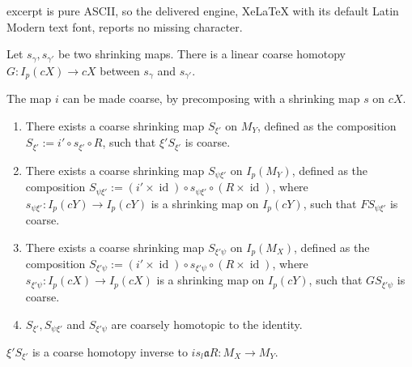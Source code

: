 \documentclass[10pt,a4paper]{amsart}
\DeclareMathOperator{\id}{id}
\begin{document}
excerpt is pure ASCII, so the delivered engine, XeLaTeX with its default Latin Modern text font, reports no missing character.
\begin{lemma} \label{shrinkindep} Let $s_{\gamma},s_{\gamma'}$ be two shrinking maps. There is a linear coarse homotopy $G: I_{p}(cX)\rightarrow cX$ between $s_{\gamma}$ and $s_{\gamma'}$.
\end{lemma}

\begin{lemma} The map $i$ can be made coarse, by precomposing with a shrinking map $s$ on $cX$. \label{shrinkcoarse}
\end{lemma}

\begin{lemma} \begin{enumerate} \label{globallycoarse}
\item There exists a coarse shrinking map $S_{\xi'}$ on $M_{Y}$, defined as the composition $S_{\xi'}:=i' \circ s_{\xi'} \circ R$, such that $\xi' S_{\xi'}$ is coarse. 
\item There exists a coarse shrinking map $S_{\psi \xi'}$ on $I_{p}(M_{Y})$, defined as the composition $S_{\psi \xi'}:= (i' \times \id) \circ s_{\psi \xi'}  \circ (R \times \id)$, where $s_{\psi \xi'}: I_{p}(cY)\rightarrow I_{p}(cY)$ is a shrinking map on $I_{p}(cY)$, such that $F S_{\psi \xi'}$ is coarse. 
\item There exists a coarse shrinking map $S_{\xi'\psi}$ on $I_{p}(M_{X})$, defined as the composition $S_{\xi'\psi}:=(i' \times \id) \circ s_{\xi'\psi}  \circ (R \times \id)$, where $s_{\xi' \psi}: I_{p}(cX)\rightarrow I_{p}(cX)$ is a shrinking map on $I_{p}(cY)$, such that $G S_{\xi' \psi}$ is coarse. 
\item $S_{\xi'}, S_{\psi \xi'}$ and $S_{\xi'\psi}$ are coarsely homotopic to the identity. 
\end{enumerate}
\end{lemma}

\begin{lemma} \label{che} $\xi' S_{\xi'}$ is a coarse homotopy inverse to $is_{l}\mathfrak{a}R: M_{X}\rightarrow M_{Y}$.  
\end{lemma}
\end{document}

